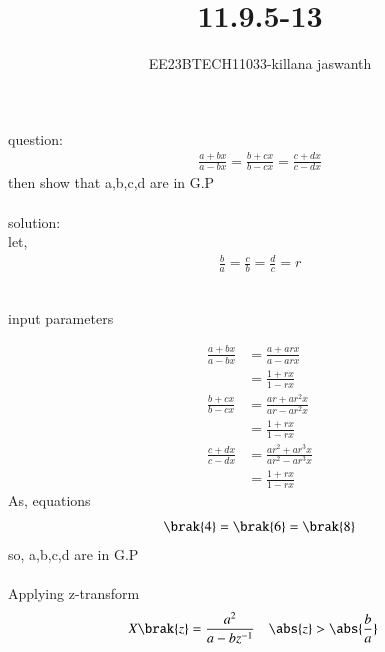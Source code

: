 \documentclass[journal,12pt,twocolumn]{IEEEtran}
\theoremstyle{remark}
\begin{document}

\vspace{3cm}

\title{11.9.5-13}
\author{EE23BTECH11033-killana jaswanth}
\maketitle
\newpage

\bigskip

\renewcommand{\thefigure}{\theenumi}
\renewcommand{\thetable}{\theenumi}
question:\begin{align}
\frac{a+bx}{a-bx}=\frac{b+cx}{b-cx}=\frac{c+dx}{c-dx}
\end{align}
then show that a,b,c,d are in G.P\\\\
solution:\\
\fi
      let,
\begin{align}
\frac{b}{a}=\frac{c}{b}=\frac{d}{c}=r
\end{align}
\\\begin{table}[!ht]
 \centering
  
   \caption{input parameters}
   \label{tab:11.9.5.13}
   \end{table}
\begin{align}
\frac{a+bx}{a-bx}&=\frac{a+arx}{a-arx}\\
&=\frac{1+rx}{1-rx}\\
\frac{b+cx}{b-cx}&=\frac{ar+ar^2x}{ar-ar^2x}\\
&=\frac{1+rx}{1-rx}\\
\frac{c+dx}{c-dx}&=\frac{ar^2+ar^3x}{ar^2-ar^3x}\\
&=\frac{1+rx}{1-rx}
\end{align}
As, equations\begin{align} \brak{4}=\brak{6}=\brak{8}
\end{align}
so, a,b,c,d are in G.P\\\\
Applying z-transform\\
\begin{align}
X\brak{z}&=\frac{a^2}{a-bz^{-1}} \quad \abs{z}>\abs{\frac{b}{a}}
\end{align}
\end{document}
